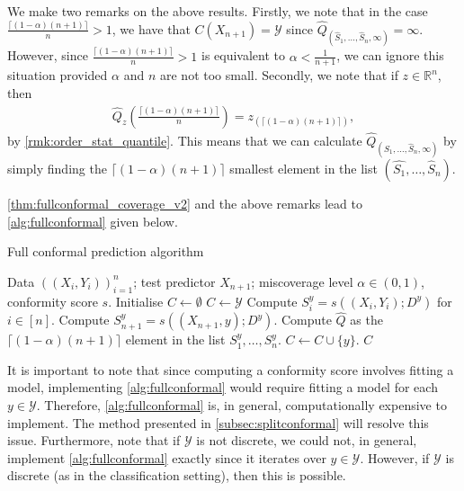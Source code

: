 \documentclass[11pt, titlepage]{article} %
\numberwithin{equation}{section}
\theoremstyle{definition}
\numberwithin{theorem}{section}
\numberwithin{lemma}{section}
\numberwithin{corollary}{section}
\numberwithin{proposition}{section}
\numberwithin{definition}{section}
\numberwithin{remark}{section}
\begin{document}
\noindent
We make two remarks on the above results. Firstly, we note that in the case \(\frac{\lceil (1-\alpha)(n+1) \rceil}{n} > 1\), we have that \(C(X_{n+1}) = \mathcal{Y}\) since \(\hat{Q}_{(\hat{S}_1, \ldots, \hat{S}_n, \infty)} = \infty\). However, since \(\frac{\lceil (1-\alpha)(n+1) \rceil}{n} > 1\) is equivalent to \(\alpha < \frac{1}{n+1}\), we can ignore this situation provided \(\alpha\) and \(n\) are not too small. Secondly, we note that if \(z \in \mathbb{R}^n\), then \begin{align*}
    \hat{Q}_z\left( \frac{\lceil (1-\alpha)(n+1) \rceil}{n} \right) = z_{(\lceil (1-\alpha)(n+1) \rceil)}, 
\end{align*} by \cref{rmk:order_stat_quantile}. This means that we can calculate \(\hat{Q}_{(\hat{S}_1, \ldots, \hat{S}_n, \infty)}\) by simply finding the \(\lceil (1-\alpha)(n+1) \rceil\) smallest element in the list \((\hat{S_1}, \ldots, \hat{S}_n)\). \vskip5pt

\noindent
\cref{thm:fullconformal_coverage_v2} and the above remarks lead to \cref{alg:fullconformal} given below.


\begin{algorithm}[H]
\caption{Full conformal prediction algorithm}
\label{alg:fullconformal}
\begin{algorithmic}
    \Require Data \(((X_i, Y_i))_{i=1}^n\); test predictor \(X_{n+1}\); miscoverage level \(\alpha \in (0,1)\), conformity score \(s\).
    \State Initialise \(C \gets \emptyset\)
        \State \(C \gets \mathcal{Y}\)
    \Else
            \State Compute \(S_i^y = s((X_i, Y_i); D^y)\) for \(i \in [n]\).
            \State Compute \(S_{n+1}^y = s((X_{n+1}, y); D^y)\).
            \State Compute \(\hat{Q}\) as the \(\lceil (1-\alpha)(n+1) \rceil \) element in the list \(S_1^y, \ldots, S_{n}^y\).
                \State \(C \gets C \cup \{y\} \).
            \EndIf      
        \EndFor
    \EndIf
    \Ensure \(C\)
\end{algorithmic}
\end{algorithm}

\noindent
\noindent
It is important to note that since computing a conformity score involves fitting a model, implementing \cref{alg:fullconformal} would require fitting a model for each \(y \in \mathcal{Y}\). Therefore, \cref{alg:fullconformal} is, in general, computationally expensive to implement. The method presented in \cref{subsec:splitconformal} will resolve this issue. Furthermore, note that if \(\mathcal{Y}\) is not discrete, we could not, in general, implement \cref{alg:fullconformal} exactly since it iterates over \(y \in \mathcal{Y}\). However, if \(\mathcal{Y}\) is discrete (as in the classification setting), then this is possible.
\end{document}
